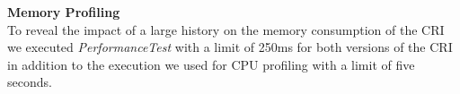 	\noindent\textbf{Memory Profiling}\\
	To reveal the impact of a large history on the memory consumption of the CRI we executed \emph{PerformanceTest} with a limit of 250ms for both versions of the CRI in addition to the execution we used for CPU profiling with a limit of five seconds.
	\begin{figure}[!h]
		\centering
		\hspace{1cm}
		\hspace{10cm} %

\end{figure}
